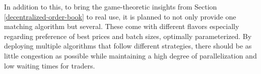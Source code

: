 \documentclass[11pt]{article}
\begin{document}
In addition to this, to bring the game-theoretic insights from Section \ref{decentralized-order-book} to real use, it is planned to not only provide one matching algorithm but several.
These come with different flavors especially regarding preference of best prices and batch sizes, optimally parameterized.
By deploying multiple algorithms that follow different strategies,
there should be as little congestion as possible while maintaining a high degree
of parallelization and low waiting times for traders.



\newpage

\end{document}

